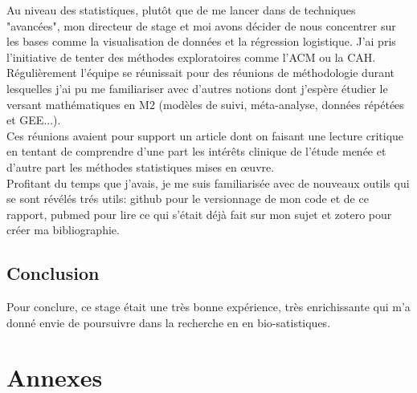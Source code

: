 \documentclass{book}
\begin{document}
\noindent
Au niveau des statistiques, plutôt que de me lancer dans de techniques "avancées", mon directeur de stage et moi avons décider de nous concentrer sur les bases comme la visualisation de données et la régression logistique. J'ai pris l'initiative de tenter des méthodes exploratoires comme l'ACM ou la CAH.\\
Régulièrement l'équipe se réunissait pour des réunions de méthodologie durant lesquelles j'ai pu me familiariser avec d'autres notions dont j'espère étudier le versant mathématiques en M2 (modèles de suivi, méta-analyse, données répétées et GEE...).\\
Ces réunions avaient pour support un article dont on faisant une lecture critique en tentant de comprendre d'une part les intérêts clinique de l'étude menée et d'autre part les méthodes statistiques mises en œuvre.\\

\noindent
Profitant du temps que j'avais, je me suis familiarisée avec de nouveaux outils qui se sont révélés trés utils: github pour le versionnage de mon code et de ce rapport, pubmed pour lire ce qui s'était déjà fait sur mon sujet et zotero pour créer ma bibliographie.



\begin{center}
\section*{Conclusion}
\noindent
Pour conclure, ce stage était une très bonne expérience, très enrichissante qui m'a donné envie de poursuivre dans la recherche en en bio-satistiques.\\
\end{center}

\backmatter
\section{Annexes}
\end{document}
